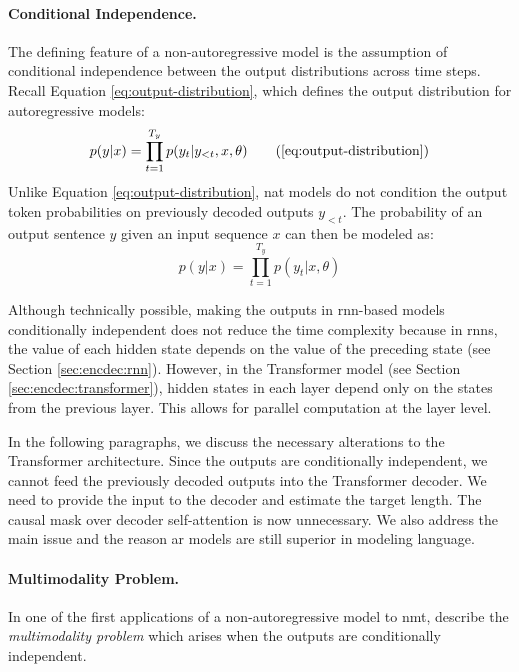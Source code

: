 \paragraph{Conditional Independence.} The defining feature of a
non-autoregressive model is the assumption of conditional independence between
the output distributions across time steps. Recall Equation
\ref{eq:output-distribution}, which defines the output distribution for
autoregressive models:
%
\begin{equation*}
  p(y|x) = \prod_{t=1}^{T_y}p(y_t|y_{<t},x,\theta)
  \tag{\ref{eq:output-distribution}}
\end{equation*}
%
Unlike Equation \ref{eq:output-distribution}, \Ac{nat} models do not condition
the output token probabilities on previously decoded outputs $y_{<t}$.  The
probability of an output sentence $y$ given an input sequence $x$ can then be
modeled as:
%
\begin{equation}
  p(y|x) = \prod_{t=1}^{T_y}p(y_t|x,\theta)
  \label{eq:nat-output-distribution}
\end{equation}

Although technically possible, making the outputs in \acs{rnn}-based models
conditionally independent does not reduce the time complexity because in
\acsp{rnn}, the value of each hidden state depends on the value of the
preceding state (see Section \ref{sec:encdec:rnn}). However, in the Transformer
model (see Section \ref{sec:encdec:transformer}), hidden states in each layer
depend only on the states from the previous layer. This allows for parallel
computation at the layer level.

In the following paragraphs, we discuss the necessary alterations to the
Transformer architecture. Since the outputs are conditionally independent, we
cannot feed the previously decoded outputs into the Transformer decoder. We
need to provide the input to the decoder and estimate the target length. The
causal mask over decoder self-attention is now unnecessary. We also address the
main issue and the reason \ac{ar} models are still superior in modeling
language.

\paragraph{Multimodality Problem.} In one of the first applications of a
non-autoregressive model to \ac{nmt}, \citet{gu2017nonautoregressive} describe
the \emph{multimodality problem} which arises when the outputs are
conditionally independent.

